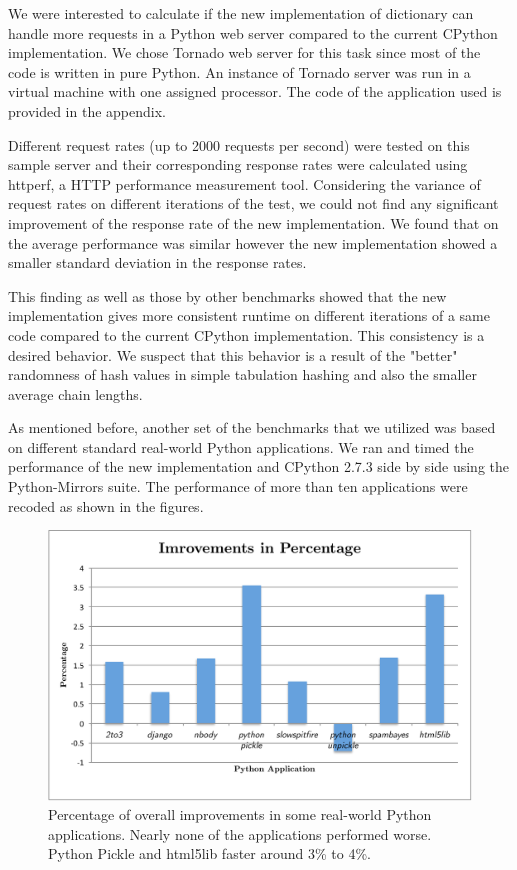\documentclass[11pt]{article}
\begin{document}
We were interested to calculate if the new implementation of dictionary can handle more requests in a Python web server compared to the current CPython implementation. We chose Tornado web server for this task since most of the code is written in pure Python. An instance of Tornado server was run in a virtual machine with one assigned processor. The code of the application used is provided in the appendix. 

Different request rates (up to 2000 requests per second) were tested on this
sample server and their corresponding response rates were calculated using
httperf, a HTTP performance measurement tool. Considering the variance of request rates on different iterations of the test, we could not find any significant improvement of the response rate of the new implementation. We found that on the average performance was similar however the new implementation showed a smaller standard deviation in the response rates. 

This finding as well as those by other benchmarks showed that the new
implementation gives more consistent runtime on different iterations of a same
code compared to the current CPython implementation. This consistency is a
desired behavior. We suspect that this behavior is a result of the "better" randomness of hash values in simple tabulation hashing and also the smaller average chain lengths.

As mentioned before, another set of the benchmarks that we utilized was based on different standard real-world Python applications. We ran and timed the performance of the new implementation and CPython 2.7.3 side by side using the Python-Mirrors suite. The performance of more than ten applications were recoded as shown in the figures.

\begin{figure}[H]
  \centering
  \includegraphics[width=12cm]{appsbench.pdf}
  \caption{Percentage of overall improvements in some real-world Python
  applications. Nearly none of the applications performed worse. Python Pickle
  and html5lib faster around 3\% to 4\%. }
\end{figure}
\end{document}
